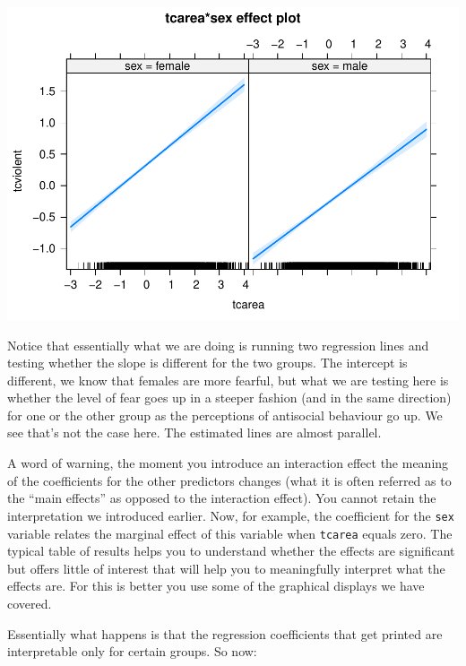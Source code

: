 \documentclass[]{book}
\theoremstyle{definition}
\theoremstyle{definition}
\theoremstyle{definition}
\theoremstyle{remark}
\begin{document}
\includegraphics{08-regression_files/figure-latex/unnamed-chunk-34-1.pdf}

Notice that essentially what we are doing is running two regression
lines and testing whether the slope is different for the two groups. The
intercept is different, we know that females are more fearful, but what
we are testing here is whether the level of fear goes up in a steeper
fashion (and in the same direction) for one or the other group as the
perceptions of antisocial behaviour go up. We see that's not the case
here. The estimated lines are almost parallel.

A word of warning, the moment you introduce an interaction effect the
meaning of the coefficients for the other predictors changes (what it is
often referred as to the ``main effects'' as opposed to the interaction
effect). You cannot retain the interpretation we introduced earlier.
Now, for example, the coefficient for the \texttt{sex} variable relates
the marginal effect of this variable when \texttt{tcarea} equals zero.
The typical table of results helps you to understand whether the effects
are significant but offers little of interest that will help you to
meaningfully interpret what the effects are. For this is better you use
some of the graphical displays we have covered.

Essentially what happens is that the regression coefficients that get
printed are interpretable only for certain groups. So now:
\end{document}
